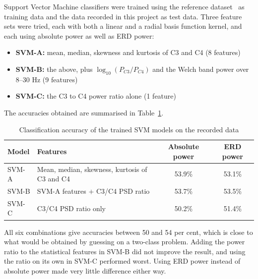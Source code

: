 Support Vector Machine classifiers were trained using the reference
dataset~\cite{liu2024mi} as training data and the data recorded in this project as test
data. Three feature sets were tried, each with both a linear and a radial basis function
kernel, and each using absolute power as well as ERD power:

\begin{itemize}
    \item \textbf{SVM-A:} mean, median, skewness and kurtosis of C3 and C4 (8 features)
    \item \textbf{SVM-B:} the above, plus $\log_{10}(P_{C3}/P_{C4})$ and the Welch band
          power over 8--30 Hz (9 features)
    \item \textbf{SVM-C:} the C3 to C4 power ratio alone (1 feature)
\end{itemize}

The accuracies obtained are summarised in Table~\ref{tab:svm_accuracy}.

\begin{table}[h]
\centering
\caption{Classification accuracy of the trained SVM models on the recorded data}
\label{tab:svm_accuracy}
\begin{tabular}{|l|p{5.6cm}|c|c|}
\hline
\textbf{Model} & \textbf{Features} & \textbf{Absolute power} & \textbf{ERD power} \\
\hline
SVM-A & Mean, median, skewness, kurtosis of C3 and C4 & 53.9\% & 53.1\% \\
\hline
SVM-B & SVM-A features $+$ C3/C4 PSD ratio & 53.7\% & 53.5\% \\
\hline
SVM-C & C3/C4 PSD ratio only & 50.2\% & 51.4\% \\
\hline
\end{tabular}
\end{table}

All six combinations give accuracies between 50 and 54 per cent, which is close to what
would be obtained by guessing on a two-class problem. Adding the power ratio to the
statistical features in SVM-B did not improve the result, and using the ratio on its own in
SVM-C performed worst. Using ERD power instead of absolute power made very little
difference either way.

